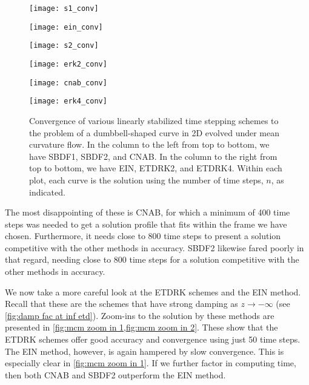 \begin{figure}[htb!]
        \centering
\begin{minipage}{0.48\textwidth}
        \texttt{[image: s1\_conv]}
\end{minipage}
\begin{minipage}{0.48\textwidth}
        \texttt{[image: ein\_conv]}
\end{minipage}
\begin{minipage}{0.48\textwidth}
        \texttt{[image: s2\_conv]}
\end{minipage}
\begin{minipage}{0.48\textwidth}
        \texttt{[image: erk2\_conv]}
\end{minipage}
\begin{minipage}{0.48\textwidth}
        \texttt{[image: cnab\_conv]}
\end{minipage}
\begin{minipage}{0.48\textwidth}
        \texttt{[image: erk4\_conv]}
\end{minipage}
\caption[Convergence of linearly stabilized schemes to the problem of a dumbbell-shaped curve evolved under mean curvature flow]{Convergence of various linearly stabilized time stepping schemes to the problem of a dumbbell-shaped curve in 2D evolved under mean curvature flow. In the column to the left from top to bottom, we have SBDF1, SBDF2, and CNAB. In the column to the right from top to bottom, we have EIN, ETDRK2, and ETDRK4. Within each plot, each curve is the solution using the number of time steps, $n$, as indicated.}
\label{fig:mcm 2d conv}
\end{figure}

The most disappointing of these is CNAB, for which a minimum of 400 time steps was needed to get a solution profile that fits within the frame we have chosen. Furthermore, it needs close to 800 time steps to present a solution competitive with the other methods in accuracy. SBDF2 likewise fared poorly in that regard, needing close to 800 time steps for a solution competitive with the other methods in accuracy. 

We now take a more careful look at the ETDRK schemes and the EIN method. Recall that these are the schemes that have strong damping as $z\to-\infty$ (see \cref{fig:damp fac at inf etd}). Zoom-ins to the solution by these methods are presented in \cref{fig:mcm zoom in 1,fig:mcm zoom in 2}. These show that the ETDRK schemes offer good accuracy and convergence using just 50 time steps. The EIN method, however, is again hampered by slow convergence. This is especially clear in \cref{fig:mcm zoom in 1}. If we further factor in computing time, then both CNAB and SBDF2 outperform the EIN method.

